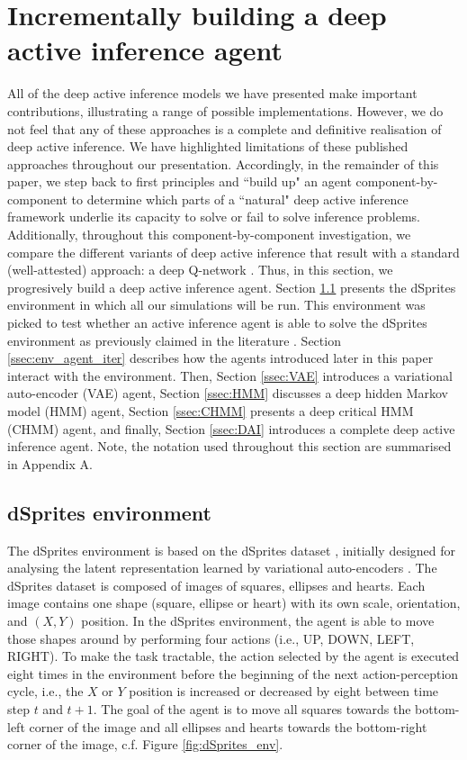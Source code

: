 \documentclass[twoside,11pt]{article}
\begin{document}
\section{Incrementally building a deep active inference agent} \label{sec:build_dai}

All of the deep active inference models we have presented make important contributions, illustrating a range of possible implementations. However, we do not feel that any of these approaches is a complete and definitive realisation of deep active inference. We have highlighted limitations of these published approaches throughout our presentation. Accordingly, in the remainder of this paper, we step back to first principles and ``build up" an agent component-by-component to determine which parts of a ``natural" deep active inference framework underlie its capacity to solve or fail to solve inference problems. Additionally, throughout this component-by-component investigation, we compare the different variants of deep active inference that result with a standard (well-attested) approach: a deep Q-network \citep{DeepRL}. Thus, in this section, we progresively build a deep active inference agent. Section \ref{ssec:dSprites_env} presents the dSprites environment in which all our simulations will be run. This environment was picked to test whether an active inference agent is able to solve the dSprites environment as previously claimed in the literature \citep{DeepAIwithMCMC}. Section \ref{ssec:env_agent_iter} describes how the agents introduced later in this paper interact with the environment. Then, Section \ref{ssec:VAE} introduces a variational auto-encoder (VAE) agent, Section \ref{ssec:HMM} discusses a deep hidden Markov model (HMM) agent, Section \ref{ssec:CHMM} presents a deep critical HMM (CHMM) agent, and finally, Section \ref{ssec:DAI} introduces a complete deep active inference agent. Note, the notation used throughout this section are summarised in Appendix A.

\subsection{dSprites environment} \label{ssec:dSprites_env}

The dSprites environment is based on the dSprites dataset \citep{dsprites17}, initially designed for analysing the latent representation learned by variational auto-encoders \citep{VAE}. The dSprites dataset is composed of images of squares, ellipses and hearts. Each image contains one shape (square, ellipse or heart) with its own scale, orientation, and $(X,Y)$ position. In the dSprites environment, the agent is able to move those shapes around by performing four actions (i.e., UP, DOWN, LEFT, RIGHT). To make the task tractable, the action selected by the agent is executed eight times in the environment before the beginning of the next action-perception cycle, i.e., the $X$ or $Y$ position is increased or decreased by eight between time step $t$ and $t+1$. The goal of the agent is to move all squares towards the bottom-left corner of the image and all ellipses and hearts towards the bottom-right corner of the image, c.f. Figure \ref{fig:dSprites_env}.
\end{document}
